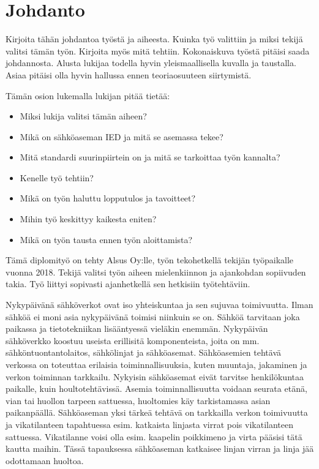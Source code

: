 \chapter{Johdanto}
\label{ch:johdanto}
\begin{it}
	Kirjoita tähän johdantoa työstä ja aiheesta. Kuinka työ valittiin ja miksi tekijä valitsi tämän työn. Kirjoita myös mitä tehtiin. Kokonaiskuva työstä pitäisi saada johdannosta. Alusta lukijaa todella hyvin yleismaallisella kuvalla ja taustalla. Asiaa pitäisi olla hyvin hallussa ennen teoriaosuuteen siirtymistä.
	
	Tämän osion lukemalla lukijan pitää tietää:
	\begin{itemize}
		\item Miksi lukija valitsi tämän aiheen?
		\item Mikä on sähköaseman IED ja mitä se asemassa tekee?
		\item Mitä standardi suurinpiirtein on ja mitä se tarkoittaa työn kannalta?
		\item Kenelle työ tehtiin?
		\item Mikä on työn haluttu lopputulos ja tavoitteet?
		\item Mihin työ keskittyy kaikesta eniten?
		\item Mikä on työn tausta ennen työn aloittamista?
	\end{itemize}
\end{it}

Tämä diplomityö on tehty Alsus Oy:lle, työn tekohetkellä tekijän työpaikalle vuonna 2018. Tekijä valitsi työn aiheen mielenkiinnon ja ajankohdan sopiivuden takia. Työ liittyi sopivasti ajanhetkellä sen hetkisiin työtehtäviin.

Nykypäivänä sähköverkot ovat iso yhteiskuntaa ja sen sujuvaa toimivuutta. Ilman sähköä ei moni asia nykypäivänä toimisi niinkuin se on. Sähköä tarvitaan joka paikassa ja tietotekniikan lisääntyessä vieläkin enemmän. Nykypäivän sähköverkko koostuu useista erillisitä komponenteista, joita on mm. sähköntuontantolaitos, sähkölinjat ja sähköasemat. Sähköasemien tehtävä verkossa on toteuttaa erilaisia toiminnallisuuksia, kuten muuntaja, jakaminen ja verkon toiminnan tarkkailu. Nykyisin sähköasemat eivät tarvitse henkilökuntaa paikalle, kuin houltotehtävissä. Asemia toiminnallisuutta voidaan seurata etänä, vian tai huollon tarpeen sattuessa, huoltomies käy tarkistamassa asian paikanpäällä. Sähköaseman yksi tärkeä tehtävä on tarkkailla verkon toimivuutta ja vikatilanteen tapahtuessa esim. katkaista linjasta virrat pois vikatilanteen sattuessa. Vikatilanne voisi olla esim. kaapelin poikkimeno ja virta pääsisi tätä kautta maihin. Tässä tapauksessa sähköaseman katkaisee linjan virran ja linja jää odottamaan huoltoa.

